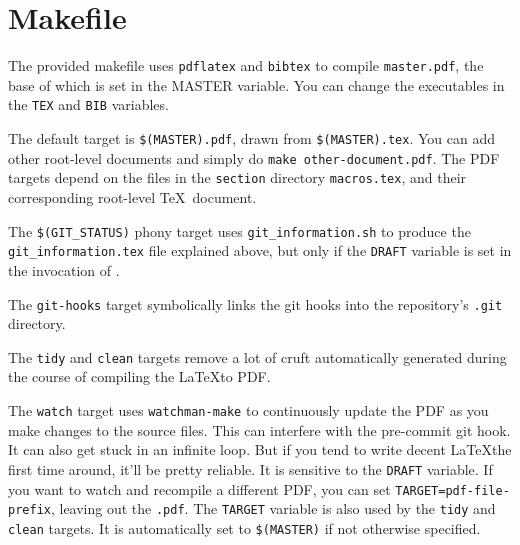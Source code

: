 \section{Makefile}

The provided makefile uses \texttt{pdflatex} and \texttt{bibtex} to compile \texttt{master.pdf}, the base of which is set in the MASTER variable.
You can change the executables in the \texttt{TEX} and \texttt{BIB} variables.

The default target is \texttt{\$(MASTER).pdf}, drawn from \texttt{\$(MASTER).tex}.
You can add other root-level documents and simply do \texttt{make other-document.pdf}.
The PDF targets depend on the files in the \texttt{section} directory \texttt{macros.tex}, and their corresponding root-level \TeX\ document.

The \texttt{\$(GIT\_STATUS)} phony target uses \texttt{git\_information.sh} to produce the \texttt{git\_information.tex} file explained above, but only if the \texttt{DRAFT} variable is set in the invocation of \make.

The \texttt{git-hooks} target symbolically links the git hooks into the repository's \texttt{.git} directory.

The \texttt{tidy} and \texttt{clean} targets remove a lot of cruft automatically generated during the course of compiling the \LaTeX to PDF.

The \texttt{watch} target uses \texttt{watchman-make}\cite{watchman} to continuously update the PDF as you make changes to the source files.
This can interfere with the pre-commit git hook.
It can also get stuck in an infinite loop.
But if you tend to write decent \LaTeX the first time around, it'll be pretty reliable.
It is sensitive to the \texttt{DRAFT} variable.
If you want to watch and recompile a different PDF, you can set \texttt{TARGET=pdf-file-prefix}, leaving out the \texttt{.pdf}.
The \texttt{TARGET} variable is also used by the \texttt{tidy} and \texttt{clean} targets.
It is automatically set to \texttt{\$(MASTER)} if not otherwise specified.
